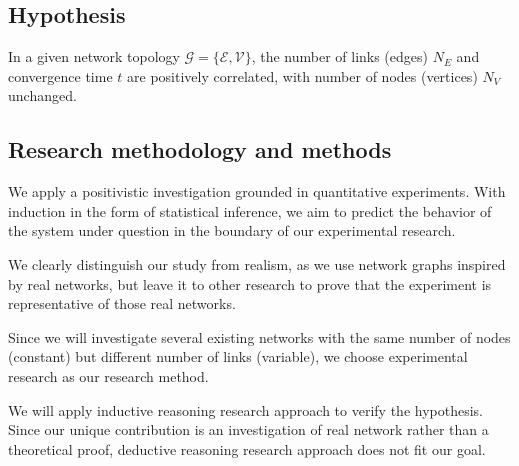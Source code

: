 \subsection{Hypothesis}
In a given network topology $\mathcal{G}=\{\mathcal{E}, \mathcal{V}\}$, the number of links (edges) $N_E$ and convergence time $t$ are positively correlated, with number of nodes (vertices) $N_V$ unchanged.

\subsection{Research methodology and methods}
We apply a positivistic investigation grounded in quantitative experiments. With induction in the form of statistical inference, we aim to predict the behavior of the system under question in the boundary of our experimental research.

We clearly distinguish our study from realism, as we use network graphs inspired by real networks, but leave it to other research to prove that the experiment is representative of those real networks.

Since we will investigate several existing networks with the same number of nodes (constant) but different number of links (variable), we choose experimental research as our research method.

We will apply inductive reasoning research approach to verify the hypothesis. Since our unique contribution is an investigation of real network rather than a theoretical proof, deductive reasoning research approach does not fit our goal.
